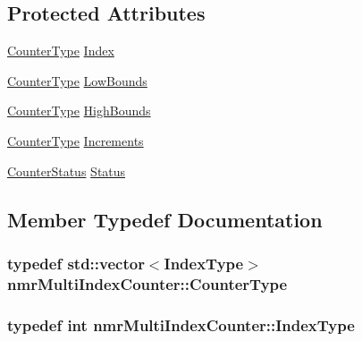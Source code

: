 \subsection*{Protected Attributes}
\begin{DoxyCompactItemize}
\item 
\hyperlink{classnmr_multi_index_counter_a6f7f42508ddcc24c957f012ffbcce57d}{Counter\-Type} \hyperlink{classnmr_multi_index_counter_a5598ea2e3618f8b799c4646f7b044e55}{Index}
\item 
\hyperlink{classnmr_multi_index_counter_a6f7f42508ddcc24c957f012ffbcce57d}{Counter\-Type} \hyperlink{classnmr_multi_index_counter_a7f1542632d9d98971b5a00056acc2d6e}{Low\-Bounds}
\item 
\hyperlink{classnmr_multi_index_counter_a6f7f42508ddcc24c957f012ffbcce57d}{Counter\-Type} \hyperlink{classnmr_multi_index_counter_ad0b3a6a43bc5c746d19bd56bcb112781}{High\-Bounds}
\item 
\hyperlink{classnmr_multi_index_counter_a6f7f42508ddcc24c957f012ffbcce57d}{Counter\-Type} \hyperlink{classnmr_multi_index_counter_aee8fabe67a3b2e5e30978e1b788cfa97}{Increments}
\item 
\hyperlink{classnmr_multi_index_counter_ad7beda3a3ee347140b4b5540770aeba5}{Counter\-Status} \hyperlink{classnmr_multi_index_counter_a0faa71921d5ef62d074493438e3f3e9c}{Status}
\end{DoxyCompactItemize}


\subsection{Member Typedef Documentation}
\hypertarget{classnmr_multi_index_counter_a6f7f42508ddcc24c957f012ffbcce57d}{
\subsubsection[{Counter\-Type}]{\setlength{\rightskip}{0pt plus 5cm}typedef std\-::vector$<${\bf Index\-Type}$>$ {\bf nmr\-Multi\-Index\-Counter\-::\-Counter\-Type}\hspace{0.3cm}{\ttfamily [protected]}}}\label{classnmr_multi_index_counter_a6f7f42508ddcc24c957f012ffbcce57d}
\hypertarget{classnmr_multi_index_counter_a0632b941a7d18df347174b4345d73d01}{
\subsubsection[{Index\-Type}]{\setlength{\rightskip}{0pt plus 5cm}typedef int {\bf nmr\-Multi\-Index\-Counter\-::\-Index\-Type}}}\label{classnmr_multi_index_counter_a0632b941a7d18df347174b4345d73d01}


